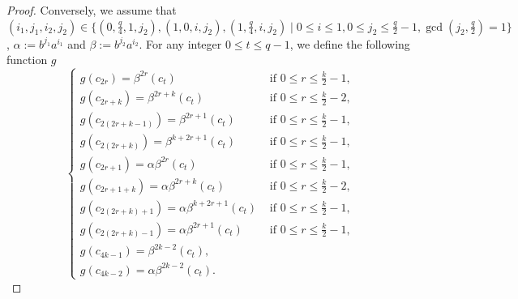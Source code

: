 \documentclass[11pt]{amsart}
\theoremstyle{plain}
\numberwithin{equation}{section}
\begin{document}
\begin{proof}
Conversely, we assume that $(i_1,j_1,i_2,j_2) \in \{(0,\frac{q}{4},1,j_2), (1,0,i,j_2), (1,\frac{q}{4},i,j_2) \mid  0 \leq i \leq 1, 0 \leq j_2 \leq \frac{q}{2}-1, \gcd(j_2,\frac{q}{2})=1\}$, $\alpha:=b^{j_1}a^{i_1}$ and $\beta:=b^{j_2}a^{i_2}$. For any integer $0 \leq t \leq q-1$, we define the following function $g$ 
\begin{equation}\label{LE48}
    \begin{cases}
       g(c_{2r})= \beta^{2r}(c_{t})& \text{ if } 0 \leq r \leq \frac{k}{2}-1, \\
       g(c_{2r+k})= \beta^{2r+k}(c_{t})& \text{ if } 0 \leq r \leq \frac{k}{2}-2, \\
       g(c_{2(2r+k-1)})= \beta^{2r+1}(c_t)& \text{ if } 0 \leq r \leq \frac{k}{2}-1, \\
       g(c_{2(2r+k)})= \beta^{k+2r+1}(c_{t})&  \text{ if }  0  \leq r \leq \frac{k}{2}-1, \\
       g(c_{2r+1})= \alpha \beta^{2r} (c_{t})&  \text{ if }  0 \leq r \leq \frac{k}{2}-1, \\
       g(c_{2r+1+k})= \alpha \beta^{2r+k} (c_{t})&  \text{ if }  0 \leq r \leq \frac{k}{2}-2, \\
       g(c_{2(2r+k)+1})= \alpha \beta^{k+2r+1} (c_{t})&  \text{ if }  0 \leq r \leq \frac{k}{2}-1, \\
        g(c_{2(2r+k)-1})= \alpha \beta^{2r+1} (c_{t})&  \text{ if }  0  \leq r \leq \frac{k}{2}-1, \\
        g(c_{4k-1})= \beta^{2k-2}(c_{t}), \\
        g(c_{4k-2})= \alpha \beta^{2k-2} (c_t).
	\end{cases}
\end{equation}



\end{proof}
\end{document}

